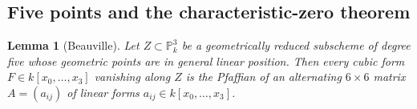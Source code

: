 \documentclass[a4paper,11pt]{amsart}
\numberwithin{equation}{section}
\newtheorem{lemma}[theorem]{Lemma}
\theoremstyle{definition}
\theoremstyle{remark}
\newcommand{\PP}{\mathbb P}
\begin{document}
\subsection{Five points and the characteristic-zero theorem}\label{sec:five}

\begin{lemma}[Beauville] %
\label{lem:presentation}
Let $Z\subset\PP^3_k$ be a geometrically reduced subscheme of degree
five whose geometric points are in general linear position.
Then every cubic form $F\in k[x_0,\dots,x_3]$ vanishing along $Z$
is the Pfaffian of an alternating $6\times 6$ matrix 
$A=(a_{ij})$ of linear forms $a_{ij}\in k[x_0,\dots ,x_3]$.   
\end{lemma}
 
\end{document}
